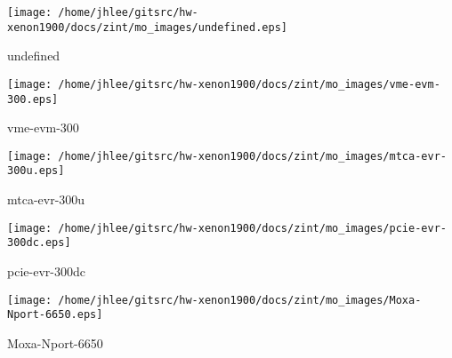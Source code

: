 \noindent
\vspace{1.4cm}
\begin{minipage}{.2\textwidth}
\begin{center}
\texttt{[image: /home/jhlee/gitsrc/hw-xenon1900/docs/zint/mo\_images/undefined.eps]}
\end{center}
\end{minipage}
\begin{minipage}{.7\textwidth}
undefined
\end{minipage}


\noindent
\vspace{1.4cm}
\begin{minipage}{.2\textwidth}
\begin{center}
\texttt{[image: /home/jhlee/gitsrc/hw-xenon1900/docs/zint/mo\_images/vme-evm-300.eps]}
\end{center}
\end{minipage}
\begin{minipage}{.7\textwidth}
vme-evm-300
\end{minipage}


\noindent
\vspace{1.4cm}
\begin{minipage}{.2\textwidth}
\begin{center}
\texttt{[image: /home/jhlee/gitsrc/hw-xenon1900/docs/zint/mo\_images/mtca-evr-300u.eps]}
\end{center}
\end{minipage}
\begin{minipage}{.7\textwidth}
mtca-evr-300u
\end{minipage}


\noindent
\vspace{1.4cm}
\begin{minipage}{.2\textwidth}
\begin{center}
\texttt{[image: /home/jhlee/gitsrc/hw-xenon1900/docs/zint/mo\_images/pcie-evr-300dc.eps]}
\end{center}
\end{minipage}
\begin{minipage}{.7\textwidth}
pcie-evr-300dc
\end{minipage}


\noindent
\vspace{1.4cm}
\begin{minipage}{.2\textwidth}
\begin{center}
\texttt{[image: /home/jhlee/gitsrc/hw-xenon1900/docs/zint/mo\_images/Moxa-Nport-6650.eps]}
\end{center}
\end{minipage}
\begin{minipage}{.7\textwidth}
Moxa-Nport-6650
\end{minipage}


